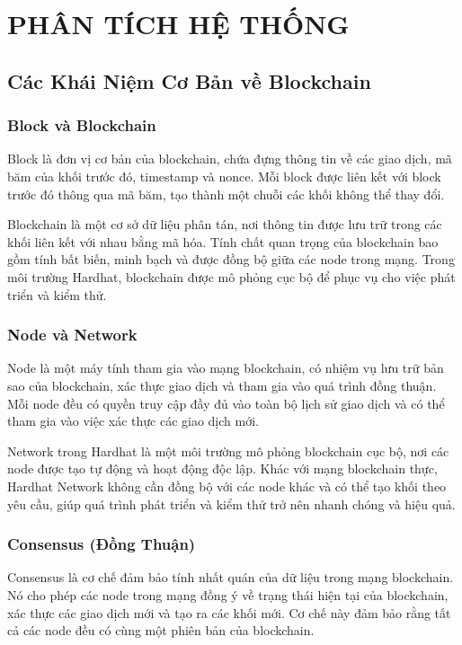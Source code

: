 \chapter{PHÂN TÍCH HỆ THỐNG}

\section{Các Khái Niệm Cơ Bản về Blockchain}

\subsection{Block và Blockchain}

\indent  Block là đơn vị cơ bản của blockchain, chứa đựng thông tin về các giao dịch, mã băm của khối trước đó, timestamp và nonce. Mỗi block được liên kết với block trước đó thông qua mã băm, tạo thành một chuỗi các khối không thể thay đổi.

Blockchain là một cơ sở dữ liệu phân tán, nơi thông tin được lưu trữ trong các khối liên kết với nhau bằng mã hóa. Tính chất quan trọng của blockchain bao gồm tính bất biến, minh bạch và được đồng bộ giữa các node trong mạng. Trong môi trường Hardhat, blockchain được mô phỏng cục bộ để phục vụ cho việc phát triển và kiểm thử.

\subsection{Node và Network}
Node là một máy tính tham gia vào mạng blockchain, có nhiệm vụ lưu trữ bản sao của blockchain, xác thực giao dịch và tham gia vào quá trình đồng thuận. Mỗi node đều có quyền truy cập đầy đủ vào toàn bộ lịch sử giao dịch và có thể tham gia vào việc xác thực các giao dịch mới.

Network trong Hardhat là một môi trường mô phỏng blockchain cục bộ, nơi các node được tạo tự động và hoạt động độc lập. Khác với mạng blockchain thực, Hardhat Network không cần đồng bộ với các node khác và có thể tạo khối theo yêu cầu, giúp quá trình phát triển và kiểm thử trở nên nhanh chóng và hiệu quả.

\subsection{Consensus (Đồng Thuận)}
Consensus là cơ chế đảm bảo tính nhất quán của dữ liệu trong mạng blockchain. Nó cho phép các node trong mạng đồng ý về trạng thái hiện tại của blockchain, xác thực các giao dịch mới và tạo ra các khối mới. Cơ chế này đảm bảo rằng tất cả các node đều có cùng một phiên bản của blockchain.

